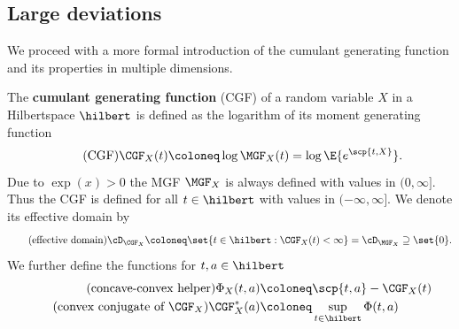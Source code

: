 \subsection{Large deviations}

We proceed with a more formal introduction of the cumulant generating function
and its properties in multiple dimensions.

\begin{definition}
    The \textbf{cumulant generating function} (CGF) of a random variable \(X\)
    in a Hilbertspace \(\hilbert\) is defined as the logarithm of its moment generating
    function
    \[\tag{CGF}
        \CGF_X(t) \coloneq \log \MGF_X(t)
        = \log \E{e^{\scp{t, X}}}.
    \]
    Due to \(\exp(x) > 0\) the MGF \(\MGF_X\) is always defined with values in \((0,
    \infty]\). Thus the CGF is defined for all \(t\in \hilbert\) with values in \((-\infty,
    \infty]\). We denote its effective domain
    by
    \[
        \tag{effective domain}
        \cD_{\CGF_X} \coloneq \set{t \in \hilbert: \CGF_X(t) < \infty} = \cD_{\MGF_X} \supseteq \set{0}.
    \]
    We further define the functions for \(t,a\in \hilbert\)
    \begin{align*}
        \tag{concave-convex helper}
        \Phi_X(t, a) &\coloneq \scp{t, a} - \CGF_X(t)
        \\
        \tag{convex conjugate of \(\CGF_X\)}
        \CGF_X^*(a) &\coloneq \sup_{t\in \hilbert} \Phi(t, a)
    \end{align*}
\end{definition}

